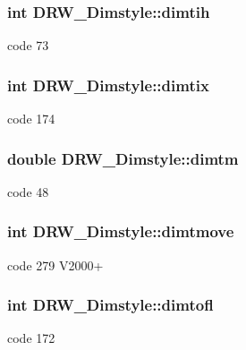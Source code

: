 \subsubsection[{dimtih}]{\setlength{\rightskip}{0pt plus 5cm}int D\+R\+W\+\_\+\+Dimstyle\+::dimtih}\label{class_d_r_w___dimstyle_add00c697c40fbc99d7f33af58ac3a75b}
code 73 \hypertarget{class_d_r_w___dimstyle_a382ba0d93da78f97e93c97ef87edfc62}{}
\subsubsection[{dimtix}]{\setlength{\rightskip}{0pt plus 5cm}int D\+R\+W\+\_\+\+Dimstyle\+::dimtix}\label{class_d_r_w___dimstyle_a382ba0d93da78f97e93c97ef87edfc62}
code 174 \hypertarget{class_d_r_w___dimstyle_a80ccee76ee51137e11097fc61bc81329}{}
\subsubsection[{dimtm}]{\setlength{\rightskip}{0pt plus 5cm}double D\+R\+W\+\_\+\+Dimstyle\+::dimtm}\label{class_d_r_w___dimstyle_a80ccee76ee51137e11097fc61bc81329}
code 48 \hypertarget{class_d_r_w___dimstyle_a6dfa91db09ae5fa28ea09cb752251a74}{}
\subsubsection[{dimtmove}]{\setlength{\rightskip}{0pt plus 5cm}int D\+R\+W\+\_\+\+Dimstyle\+::dimtmove}\label{class_d_r_w___dimstyle_a6dfa91db09ae5fa28ea09cb752251a74}
code 279 V2000+ \hypertarget{class_d_r_w___dimstyle_a23a67180f9fb818301a9a9596818eabb}{}
\subsubsection[{dimtofl}]{\setlength{\rightskip}{0pt plus 5cm}int D\+R\+W\+\_\+\+Dimstyle\+::dimtofl}\label{class_d_r_w___dimstyle_a23a67180f9fb818301a9a9596818eabb}
code 172 \hypertarget{class_d_r_w___dimstyle_a1b18fcdd37b17dda1613d19b3302c7b1}{}
